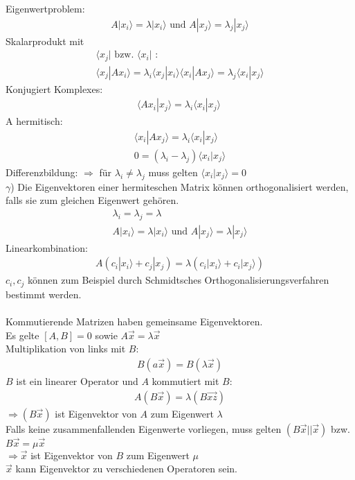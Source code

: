 \documentclass{article}
\begin{document}
Eigenwertproblem: \begin{eqnarray*}
    A|x_i\rangle = \lambda|x_i\rangle \text{ und } A|x_j\rangle = \lambda_j|x_j\rangle
\end{eqnarray*}
Skalarprodukt mit\begin{eqnarray*}
    \langle x_j|\text{ bzw. }\langle x_i |\text{ : }\\
    \langle x_j|Ax_i\rangle = \lambda_i \langle x_j | x_i \rangle
    \langle x_i|Ax_j\rangle = \lambda_j \langle x_i | x_j \rangle
\end{eqnarray*}
Konjugiert Komplexes: \begin{eqnarray*}
    \langle Ax_i|x_j\rangle = \lambda_i\langle x_i|x_j\rangle\
\end{eqnarray*}
A hermitisch:
\begin{eqnarray*}
    \langle x_i|Ax_j\rangle = \lambda_i \langle x_i|x_j\rangle\\
    0 = \left(\lambda_i - \lambda_j\right)\langle x_i|x_j\rangle
\end{eqnarray*}
Differenzbildung: $\Rightarrow$ für $\lambda_i \neq \lambda_j$ muss gelten $\langle x_i|x_j\rangle = 0$\\
$\gamma$) Die Eigenvektoren einer hermiteschen Matrix können orthogonalisiert werden, falls sie zum gleichen Eigenwert gehören.\\
\begin{eqnarray*}
    \lambda_i = \lambda_j = \lambda\\
    A|x_i\rangle = \lambda|x_i\rangle \text{ und } A|x_j\rangle = \lambda|x_j\rangle
\end{eqnarray*}
Linearkombination:
\begin{eqnarray*}
    A\left(c_i|x_i\rangle +c_j|x_j\right) = \lambda\left(c_i|x_i\rangle+c_i|x_j\rangle\right)
\end{eqnarray*}
$c_i,c_j$ können zum Beispiel durch Schmidtsches Orthogonalisierungsverfahren bestimmt werden.\\\\
Kommutierende Matrizen haben gemeinsame Eigenvektoren.\\
Es gelte $\left[A,B\right] = 0$ sowie $A\vec{x} = \lambda \vec{x}$\\
Multiplikation von links mit $B$:\begin{eqnarray*}
    B(a\vec{x}) = B(\lambda\vec{x})
\end{eqnarray*}
$B$ ist ein linearer Operator und $A$ kommutiert mit $B$:
\begin{eqnarray*}
    A(B\vec{x}) = \lambda(B\vec{xz})
\end{eqnarray*}
$\Rightarrow (B\vec{x})$ ist Eigenvektor von $A$ zum Eigenwert $\lambda$\\
Falls keine zusammenfallenden Eigenwerte vorliegen, muss gelten $(B\vec{x}||\vec{x})$ bzw. $B\vec{x}=\mu\vec{x}$\\
$\Rightarrow \vec{x}$ ist Eigenvektor von $B$ zum Eigenwert $\mu$\\
$\vec{x}$ kann Eigenvektor zu verschiedenen Operatoren sein.
\end{document}
